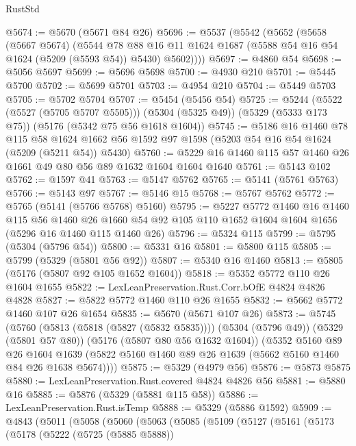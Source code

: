 \begin{lexlean}{RustStd}
\begin{coremodule}
@5674 := @5670 (@5671 @84 @26)
@5696 := @5537
    (@5542
      (@5652
        (@5658
          (@5667 @5674)
          (@5544
            @78
            @88
            @16
            @11
            @1624
            @1687
            (@5588 @54 @16 @54 @1624 (@5209 (@5593 @54)) @5430)
            @5602))))
@5697 := @4860 @54
@5698 := @5056 @5697
@5699 := @5696 @5698
@5700 := @4930 @210
@5701 := @5445 @5700
@5702 := @5699 @5701
@5703 := @4954 @210
@5704 := @5449 @5703
@5705 := @5702 @5704
@5707 := @5454 (@5456 @54)
@5725 := @5244
    (@5522 (@5527 (@5705 @5707 @5505)))
    (@5304 (@5325 @49))
    (@5329 (@5333 @173 @75))
    (@5176 (@5342 @75 @56 @1618 @1604))
@5745 := @5186
    @16
    @1460
    @78
    @115
    @58
    @1624
    @1662
    @56
    @1592
    @97
    @1598
    (@5203 @54 @16 @54 @1624 (@5209 (@5211 @54)) @5430)
@5760 := @5229 @16 @1460 @115 @57 @1460 @26 @1661 @49 @80 @56 @89 @1632 @1604 @1604 @1640
@5761 := @5143 @102
@5762 := @1597 @41
@5763 := @5147 @5762
@5765 := @5141 (@5761 @5763)
@5766 := @5143 @97
@5767 := @5146 @15
@5768 := @5767 @5762
@5772 := @5765 (@5141 (@5766 @5768) @5160)
@5795 := @5227
    @5772
    @1460
    @16
    @1460
    @115
    @56
    @1460
    @26
    @1660
    @54
    @92
    @105
    @110
    @1652
    @1604
    @1604
    @1656
    (@5296 @16 @1460 @115 @1460 @26)
@5796 := @5324 @115
@5799 := @5795 (@5304 (@5796 @54))
@5800 := @5331 @16
@5801 := @5800 @115
@5805 := @5799 (@5329 (@5801 @56 @92))
@5807 := @5340 @16 @1460
@5813 := @5805 (@5176 (@5807 @92 @105 @1652 @1604))
@5818 := @5352 @5772 @110 @26 @1604 @1655
@5822 := LexLeanPreservation.Rust.Corr.bOfE @4824 @4826 @4828
@5827 := @5822 @5772 @1460 @110 @26 @1655
@5832 := @5662 @5772 @1460 @107 @26 @1654
@5835 := @5670 (@5671 @107 @26)
@5873 := @5745
    (@5760
      (@5813 (@5818 (@5827 (@5832 @5835))))
      (@5304 (@5796 @49))
      (@5329 (@5801 @57 @80))
      (@5176 (@5807 @80 @56 @1632 @1604))
      (@5352
        @5160
        @89
        @26
        @1604
        @1639
        (@5822 @5160 @1460 @89 @26 @1639 (@5662 @5160 @1460 @84 @26 @1638 @5674))))
@5875 := @5329 (@4979 @56)
@5876 := @5873 @5875
@5880 := LexLeanPreservation.Rust.covered @4824 @4826 @56
@5881 := @5880 @16
@5885 := @5876 (@5329 (@5881 @115 @58))
@5886 := LexLeanPreservation.Rust.isTemp
@5888 := @5329 (@5886 @1592)
@5909 := @4843
    (@5011
      (@5058
        (@5060
          (@5063
            (@5085
              (@5109
                (@5127
                  (@5161
                    (@5173
                      (@5178
                        (@5222
                          (@5725 (@5885 @5888))

\end{coremodule}
\end{lexlean}
